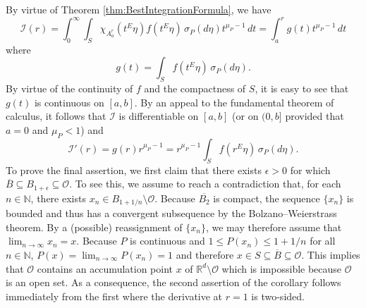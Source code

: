 \documentclass[smallextended]{svjour3}
\theoremstyle{remark}
\renewenvironment{proof}[1][\proofname]{\renewcommand\xproofname{#1}\xproof}{\endxproof}
\begin{document}
\begin{proof}
By virtue of Theorem \ref{thm:BestIntegrationFormula}, we have
\begin{equation*}
\mathcal{I}(r)=\int_0^\infty\int_S \chi_{A_a^r}(t^E\eta)f(t^E\eta)\,\sigma_P(d\eta) t^{\mu_P-1}\,dt=\int_a^r g(t)t^{\mu_P-1}\,dt
\end{equation*}
where
\begin{equation*}
g(t)=\int_S f(t^E\eta)\,\sigma_P(d\eta).
\end{equation*}
By virtue of the continuity of $f$ and the compactness of $S$, it is easy to see that $g(t)$ is continuous on $[a,b]$. By an appeal to the fundamental theorem of calculus, it follows that $\mathcal{I}$ is differentiable on $[a,b]$ (or on $(0,b]$ provided that $a=0$ and $\mu_P<1$) and
\begin{equation*}
\mathcal{I}'(r)=g(r)r^{\mu_P-1}=r^{\mu_P-1}\int_S f(r^E\eta)\,\sigma_P(d\eta).
\end{equation*}
To prove the final assertion, we first claim that there exists $\epsilon>0$ for which $\overline{B}\subseteq B_{1+\epsilon}\subseteq \mathcal{O}$. To see this, we assume to reach a contradiction that, for each $n\in\mathbb{N}$, there exists $x_n \in B_{1+1/n} \setminus \mathcal{O}$. Because $\overline{B_2}$ is compact, the sequence $\{x_n\}$ is bounded and thus has a convergent subsequence by the Bolzano–Weierstrass theorem. By a (possible) reassignment of $\{x_n\}$, we may therefore assume that $\lim_{n\to \infty} x_n = x$. Because $P$ is continuous and $1 \leq P(x_n) \leq 1 + 1/n$ for all $n\in \mathbb{N}$, $P(x)=\lim_{n\to\infty}P(x_n)=1$ and therefore $x\in S \subseteq \overline{B} \subseteq \mathcal{O}$. This implies that $\mathcal{O}$ contains an accumulation point $x$ of $\mathbb{R}^d\setminus\mathcal{O}$ which is impossible because $\mathcal{O}$ is an open set. As a consequence, the second assertion of the corollary follows immediately from the first where the derivative at $r=1$ is two-sided.
\end{proof}
\end{document}
